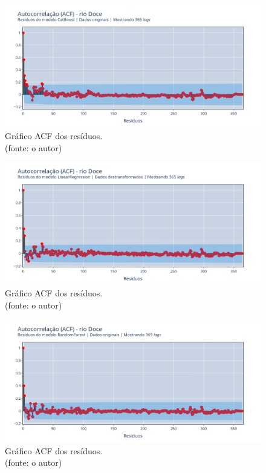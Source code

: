 \begin{figure}[!h]
\centering
\includegraphics[scale=0.33]{Figuras/rio_doce/wfv/CB/CB_WFV_ORIG_RESID_ACF.png}
\caption{Gráfico ACF dos resíduos.\\(fonte: o autor)}
\label{fig:doce_CB_WFV_ORIG_RESID_ACF}
\end{figure}

\begin{figure}[!h]
\centering
\includegraphics[scale=0.33]{Figuras/rio_doce/wfv/LR/LR_WFV_LOG_RESID_ACF.png}
\caption{Gráfico ACF dos resíduos.\\(fonte: o autor)}
\label{fig:doce_LR_WFV_LOG_RESID_ACF}
\end{figure}

\begin{figure}[!h]
\centering
\includegraphics[scale=0.33]{Figuras/rio_doce/wfv/RF/RF_WFV_ORIG_RESID_ACF.png}
\caption{Gráfico ACF dos resíduos.\\(fonte: o autor)}
\label{fig:doce_RF_WFV_ORIG_RESID_ACF}
\end{figure}

